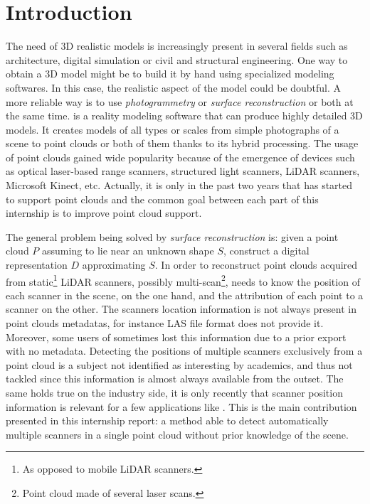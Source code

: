 \chapter{Introduction}
\label{ch:introduction}

The need of 3D realistic models is increasingly present in several fields such as architecture, digital simulation or civil and structural engineering. One way to obtain a 3D model might be to build it by hand using specialized modeling softwares. In this case, the realistic aspect of the model could be doubtful. A more reliable way is to use \emph{photogrammetry} or \emph{surface reconstruction} or both at the same time. \CC is a reality modeling software that can produce highly detailed 3D  models. It creates models of all types or scales from simple photographs of a scene to point clouds or both of them thanks to its hybrid processing. The usage of point clouds gained wide popularity because of the emergence of devices such as optical laser-based range scanners, structured light scanners, LiDAR scanners, Microsoft Kinect, etc. Actually, it is only in the past two years that \CC has started to support point clouds and the common goal between each part of this internship is to improve \CC point cloud support.

The general problem being solved by \emph{surface reconstruction} is:  given a point cloud $P$ assuming to lie near an unknown shape $S$,  construct a digital representation $D$ approximating $S$. In order to reconstruct point clouds acquired from static\footnote{As opposed to mobile LiDAR scanners.} LiDAR scanners, possibly multi-scan\footnote{Point cloud made of several laser scans.}, \CC needs to know the position of each scanner in the scene, on the one hand, and the attribution of each point to a scanner on the other. The scanners location information is not always present in point clouds metadatas, for instance LAS file format does not provide it. Moreover, some users of \CC sometimes lost this information due to a prior export with no metadata. Detecting the positions of multiple scanners exclusively from a point cloud is a subject not identified as interesting by academics, and thus not tackled since this information is almost always available from the outset. The same holds true on the industry side, it is only recently that scanner position information is relevant for a few applications like \CC. This is the main contribution presented in this internship report: a method able to detect automatically multiple scanners in a single point cloud without prior knowledge of the scene.

